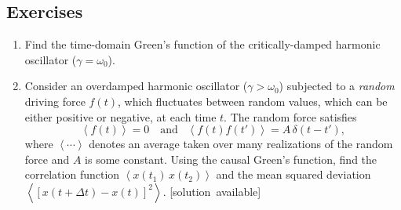 \documentclass[10pt,a4paper]{article}
\begin{document}
\subsection{Exercises}\label{exercises}

\begin{enumerate}
\item
  Find the time-domain Green's function of the critically-damped
  harmonic oscillator ($\gamma = \omega_0$).
\item
  Consider an overdamped harmonic oscillator ($\gamma > \omega_0$)
  subjected to a \emph{random} driving force $f(t)$, which fluctuates
  between random values, which can be either positive or negative, at
  each time $t$. The random force satisfies
  \begin{equation}
    \left\langle f(t)\right\rangle = 0 \quad\mathrm{and}\;\;\;\left\langle f(t) f(t')\right\rangle = A \, \delta(t-t'),
  \end{equation}
  where $\left\langle\cdots\right\rangle$ denotes an average taken
  over many realizations of the random force and $A$ is some constant.
  Using the causal Green's function, find the correlation function
  $\left\langle x(t_1)\, x(t_2) \right\rangle$ and the mean squared
  deviation $\left\langle [x(t+\Delta t) - x(t)]^2 \right\rangle.$
  \vskip -0.05in
  \hfill{\scriptsize [solution~available]}
\end{enumerate}
\end{document}
